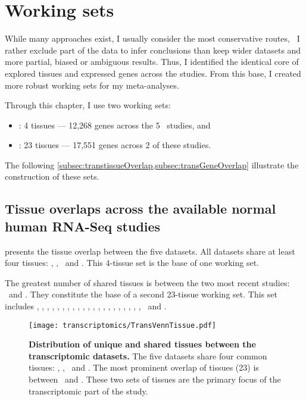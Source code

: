 \section{Working sets}

While many approaches exist,
I usually consider the most conservative routes,
\ie\ I rather exclude part of the data to infer conclusions than
keep wider datasets and more partial, biased or ambiguous results.
Thus, I identified the identical core of
explored tissues and expressed genes across the studies.
From this base, I created more robust working sets for my meta-analyses.

Through this chapter, I use two working sets:
\begin{itemize}[topsep=0pt,nosep]
    \item \setOne: 4 tissues --- 12,268 genes across the 5 \Rnaseq\ studies, and
    \item \setTwo: 23 tissues --- 17,551 genes across 2 of these studies.
\end{itemize}

The following \cref{subsec:transtissueOverlap,subsec:transGeneOverlap}
illustrate the construction of these sets.

\subsection{Tissue overlaps across the available normal human RNA-Seq studies}%
\label{subsec:transtissueOverlap}

 presents the tissue overlap between the five datasets.
All datasets share at least four tissues:
\heart, \kidney, \liver\ and \testis.
This 4-tissue set is the base of one working set.

The greatest number of shared tissues is
between the two most recent studies:
\uhlen\ and \gtex.
They constitute the base of a second 23-tissue working set.
This set includes
\Adipose, \Adrenal, \Bladder, \Cortex, \hcolon, \Esophagus,
\Fallopian, \heart, \kidney, \liver, \lung, \Ovary, \Pancreas, \Prostate,
\salivary, \skeletal, \skin, \intestine, \spleen, \stomach, \testis,
\thyroid\ and \uterus.

\begin{figure}[!htbp]
\texttt{[image: transcriptomics/TransVennTissue.pdf]}\centering
\caption[Distribution of unique and shared tissues between the
transcriptomic datasets]
{\label{fig:VennStudiesT}\textbf{Distribution of unique and shared tissues
between the transcriptomic datasets.} The five datasets share four
common tissues: \heart, \kidney, \liver\ and \testis.
The most prominent overlap of tissues (23) is between \uhlen\ and \gtex.
These two sets of tissues are the primary focus of the transcriptomic part of the
study.}
\end{figure}

